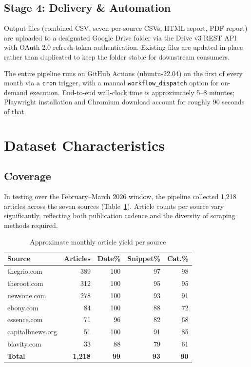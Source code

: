 \documentclass[sigconf,anonymous,review]{acmart}
\begin{document}
\subsection{Stage 4: Delivery \& Automation}

Output files (combined CSV, seven per-source CSVs, HTML report, PDF report) are
uploaded to a designated Google Drive folder via the Drive v3 REST API with
OAuth 2.0 refresh-token authentication.
Existing files are updated in-place rather than duplicated to keep the folder
stable for downstream consumers.

The entire pipeline runs on GitHub Actions (ubuntu-22.04) on the first of every
month via a \texttt{cron} trigger, with a manual \texttt{workflow\_dispatch}
option for on-demand execution.
End-to-end wall-clock time is approximately 5–8 minutes; Playwright installation
and Chromium download account for roughly 90 seconds of that.

\section{Dataset Characteristics}

\subsection{Coverage}

In testing over the February–March 2026 window, the pipeline collected
1,218 articles across the seven sources (Table~\ref{tab:coverage}).
Article counts per source vary significantly, reflecting both publication
cadence and the diversity of scraping methods required.

\begin{table}[h]
\caption{Approximate monthly article yield per source}
\label{tab:coverage}
\small
\begin{tabular}{lrrrr}
\toprule
\textbf{Source} & \textbf{Articles} & \textbf{Date\%} & \textbf{Snippet\%} & \textbf{Cat.\%} \\
\midrule
thegrio.com      & 389 & 100 & 97 & 98 \\
theroot.com      & 312 & 100 & 95 & 95 \\
newsone.com      & 278 & 100 & 93 & 91 \\
ebony.com        &  84 & 100 & 88 & 72 \\
essence.com      &  71 &  96 & 82 & 68 \\
capitalbnews.org &  51 & 100 & 91 & 85 \\
blavity.com      &  33 &  88 & 79 & 61 \\
\midrule
\textbf{Total}   & \textbf{1,218} & \textbf{99} & \textbf{93} & \textbf{90} \\
\bottomrule
\end{tabular}
\end{table}
\end{document}
